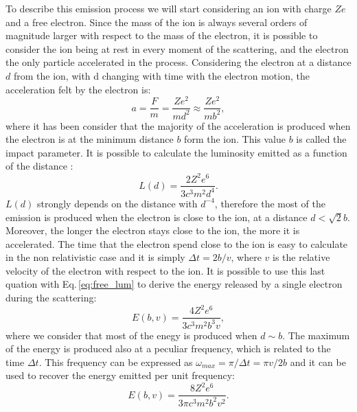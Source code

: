 \documentclass[../main.tex]{subfiles}
\begin{document}
To describe this emission process we will start considering an ion with charge $Ze$ and a free electron.
Since the mass of the ion is always several orders of magnitude larger with respect to the mass of the electron, it is possible to consider the ion being at rest in every moment of the scattering, and the electron the only particle accelerated in the process.
Considering the electron at a distance $d$ from the ion, with d changing with time with the electron motion, the acceleration felt by the electron is:
\begin{equation}
    \label{eq:acceleration}
    a = \frac{F}{m} = \frac{Ze^2}{md^2}\approx \frac{Ze^2}{mb^2},
\end{equation}
where it has been consider that the majority of the acceleration is produced when the electron is at the minimum distance $b$ form the ion.
This value $b$ is called the impact parameter.
It is possible to calculate the luminosity emitted as a function of the distance \citep{Deyoung02}:
\begin{equation}
    \label{eq:free_lum}
    L(d) = \frac{2Z^2e^6}{3c^3m^2d^4}.
\end{equation}
$L(d)$ strongly depends on the distance with $d^{-4}$, therefore the most of the emission is produced when the electron is close to the ion, at a distance $d<\sqrt{2}b$.
Moreover, the longer the electron stays close to the ion, the more it is accelerated.
The time that the electron spend close to the ion is easy to calculate in the non relativistic case and it is simply $\Delta t = 2b/v$, where $v$ is the relative velocity of the electron with respect to the ion.
It is possible to use this last quation with Eq.\,\ref{eq:free_lum} to derive the energy released by a single electron during the scattering:
\begin{equation}
    \label{eq:free_energy}
    E(b,v) = \frac{4Z^2e^6}{3c^3m^2b^3v},
\end{equation}
where we consider that most of the enegy is produced when $d\sim b$.
The maximum of the energy is produced also at a peculiar frequency, which is related to the time $\Delta t$.
This frequency can be expressed as $\omega_{max} = \pi/\Delta t = \pi v/2b$ and it can be used to recover the energy emitted per unit frequency:
\begin{equation}
    \label{eq:free_energy_freq}
    E(b,v) = \frac{8Z^2e^6}{3\pi c^3m^2b^2v^2}.
\end{equation}
\end{document}
